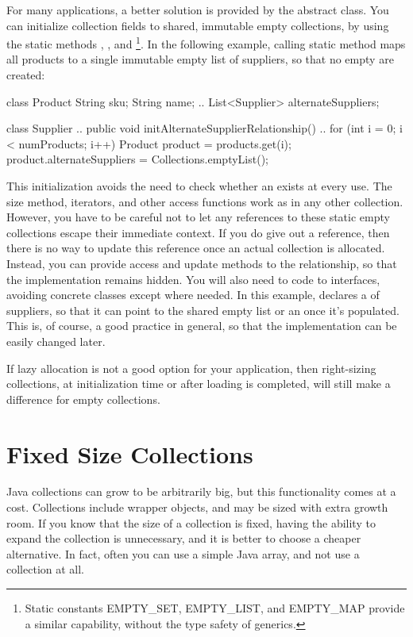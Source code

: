 For many applications, a better solution is provided by the abstract
 class. You can initialize collection fields to shared,
immutable empty collections, by using the static methods ,
, and \footnote{Static
constants EMPTY\_SET, EMPTY\_LIST, and EMPTY\_MAP provide a similar capability,
without the type safety of generics.}.
In the following example, calling static method 
maps all products to a single immutable empty list of suppliers, so that no
empty  are created:

\begin{shortlisting}
class Product {
	String sku;
	String name;
	.. 
	List<Supplier> alternateSuppliers;
}
 
class Supplier {
	..
    public void initAlternateSupplierRelationship() {
       ..
       for (int i = 0; i < numProducts; i++) {
          Product product = products.get(i);
          product.alternateSuppliers = 
                               Collections.emptyList();
		}
    } 
}
\end{shortlisting}
This initialization avoids the need to check whether an 
exists at every use. The size method, iterators, and other access functions
work as in any other collection.
However, you have to be careful not to let any references to these static empty
collections escape their immediate context. If you do give out a reference, 
then there is no way to update this reference once an actual collection is
allocated. Instead, you can provide access and update methods to the relationship, so that the implementation remains hidden.
You will also need to code to interfaces, avoiding concrete classes
except where needed. In this example,  declares
a  of suppliers, so that it can point to the shared empty list or
an  once it's populated.
This is, of course, a good practice in general, so that the implementation can
be easily changed later.

If lazy allocation is not a good option for your application, then
right-sizing collections, at initialization time or after loading is
completed, will still make a difference for empty collections.

\section{Fixed Size Collections}

Java collections can grow to be
arbitrarily big, but this functionality comes at a cost.
Collections include wrapper objects, and 
may be sized with extra growth room. If
you know that the size of a collection is fixed, having the ability to expand
the collection is unnecessary, and it is better to choose a cheaper alternative.
In fact, often you can use a
simple Java array, and not use a collection at all.  

